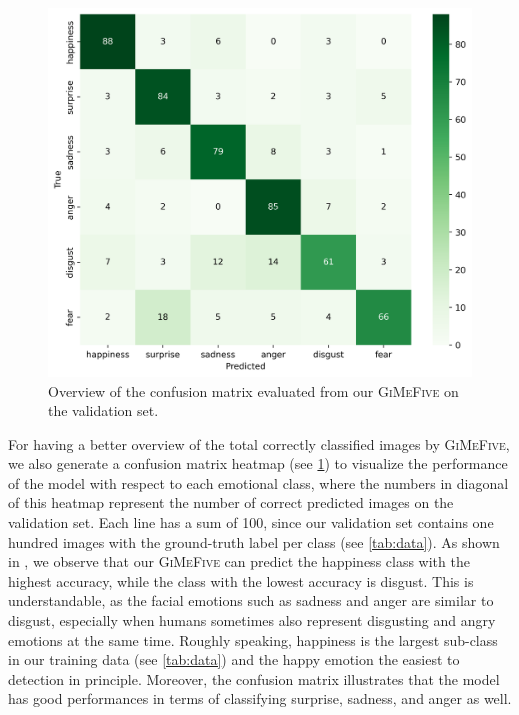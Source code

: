 \begin{figure}[ht]
  \centering
   \includegraphics[width=\linewidth]{matval.png}
   \caption{Overview of the confusion matrix evaluated from our \textsc{GiMeFive} on the validation set.} 
   \label{fig:matval}
\end{figure}

For having a better overview of the total correctly classified images by \textsc{GiMeFive}, 
we also generate a confusion matrix heatmap (see \cref{fig:matval}) to visualize the performance of the model with respect to each emotional class, 
where the numbers in diagonal of this heatmap represent the number of correct predicted images on the validation set. 
Each line has a sum of 100, 
since our validation set contains one hundred images with the ground-truth label per class (see \cref{tab:data}). 
As shown in , 
we observe that our \textsc{GiMeFive} can predict the happiness class with the highest accuracy, 
while the class with the lowest accuracy is disgust. 
This is understandable, 
as the facial emotions such as sadness and anger are similar to disgust, 
especially when humans sometimes also represent disgusting and angry emotions at the same time. 
Roughly speaking, 
happiness is the largest sub-class in our training data (see \cref{tab:data}) and the happy emotion the easiest to detection in principle. 
Moreover, 
the confusion matrix illustrates that the model has good performances in terms of classifying surprise, sadness, and anger as well. 

